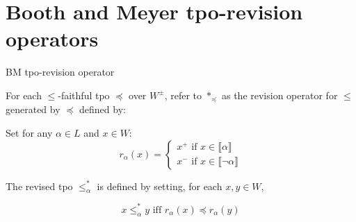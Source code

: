 \documentclass[11pt]{beamer}
\newcommand{\modelsOf}[1]{\llbracket #1 \rrbracket}
\begin{document}
\section{Booth and Meyer tpo-revision operators}

\begin{frame}{BM tpo-revision operator}
    \begin{definition}
        \label{definition:revision-operator}
        For each $\leq$-faithful tpo $\preceq$ over $W^{\pm}$, refer to $\ast_{\preceq}$ as the revision operator for $\leq$ generated by $\preceq$ defined by:
        
        Set for any $\alpha \in L$ and $x \in W$:
        \begin{equation*}
            r_{\alpha}(x) = \left\{
                        \begin{array}{ll}
                          x^{+} \textrm{ if } x \in \modelsOf{\alpha}\\
                          x^{-} \textrm{ if } x \in \modelsOf{\neg\alpha}
                        \end{array}
                      \right.
        \end{equation*}
        
        The revised tpo $\leq_{\alpha}^{\ast}$ is defined by setting, for each $x, y \in W$,
    
        \begin{equation*}
            x \leq_{\alpha}^{\ast} y \textrm{ iff } r_{\alpha}(x) \preceq r_{\alpha}(y)
        \end{equation*}
    \end{definition}

\end{frame}
\end{document}
